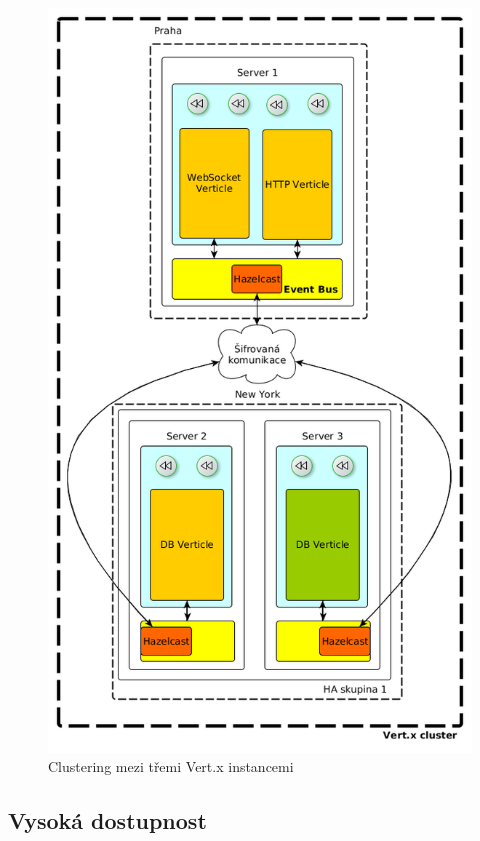 \begin{figure}
\begin{centering}
\includegraphics[scale=0.5]{obrazky/instance4_eventbus_geolocation}
\par\end{centering}
\caption{Clustering mezi třemi Vert.x instancemi \label{fig:instance4_eventbus_geolocation}}
\end{figure}

\subsection{Vysoká dostupnost}

